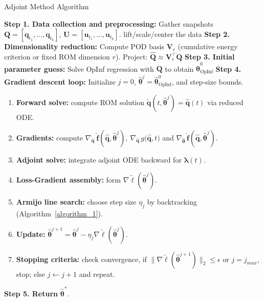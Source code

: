 \begin{frame}{Adjoint Method Algorithm}
    
\begin{center}
\begin{minipage}{0.97\textwidth}
\scriptsize
\LinesNotNumbered
\begin{algorithm}[H]
\caption{Adjoint Method for Parameter Training}\label{algorithm_2}
\SetAlgoNoLine
\textbf{Step 1. Data collection and preprocessing:} Gather snapshots $\mathbf{Q}=[\mathbf{q}_{t_1},\dots,\mathbf{q}_{t_k}]$, $\mathbf{U}=[\mathbf{u}_{t_1},\dots,\mathbf{u}_{t_k}]$.
\quad [Optional] lift/scale/center the data\;
\textbf{Step 2. Dimensionality reduction:} Compute POD basis $\mathbf{V}_r$ (cumulative energy criterion or fixed ROM dimension $r$). Project: $\hat{\mathbf{Q}} \approx \mathbf{V}_r^\top\mathbf{Q}$\;
\textbf{Step 3. Initial parameter guess:} Solve OpInf regression with $\dot{\mathbf{Q}}$ to obtain $\hat{\bm\theta}^{0}_{\text{OpInf}}$\;
\textbf{Step 4. Gradient descent loop:}
Initialize $j=0$, $\hat{\bm\theta}^j=\hat{\bm\theta}^{0}_{\text{OpInf}}$, and step-size bounds.
\begin{enumerate}
  \item \textbf{Forward solve:}
    compute ROM solution $\tilde{\mathbf{q}}(t,\hat{\bm\theta}^j) = \hat{\mathbf{q}}(t)$ via reduced ODE.
  \item \textbf{Gradients:}
    compute $\nabla_{\hat{\mathbf{q}}}~\hat{\mathbf{f}}(\hat{\mathbf{q}}, \hat{\bm{\theta}}^j),~\nabla_{\hat{\mathbf{q}}}\,g\bigl(\hat{\mathbf{q}},t\bigr)$ and $\nabla_{\hat{\bm{\theta}}}\,\hat{\mathbf{f}}(\hat{\mathbf{q}}, \hat{\bm{\theta}}^j)$.
  \item \textbf{Adjoint solve:}
    integrate adjoint ODE backward for $\bm\lambda(t)$.
  \item \textbf{Loss-Gradient assembly:}
    form $\nabla\tilde\ell(\hat{\bm\theta}^j)$.
  \item \textbf{Armijo line search:}
    choose step size $\eta_j$ by backtracking (Algorithm~\ref{algorithm_1}).
  \item \textbf{Update:}
    $\hat{\bm\theta}^{j+1}=\hat{\bm\theta}^j-\eta_j\nabla\tilde\ell(\hat{\bm\theta}^j)$.
  \item \textbf{Stopping criteria:}
    check convergence, if $\|\nabla\tilde\ell(\hat{\bm\theta}^{j+1})\|_2\le\epsilon$ or $j=j_{max}$, stop; else $j\leftarrow j+1$ and repeat.
\end{enumerate}
\textbf{Step 5. Return} {$\hat{\bm\theta}^*$}.
\end{algorithm}
\end{minipage}
\end{center}

\end{frame}